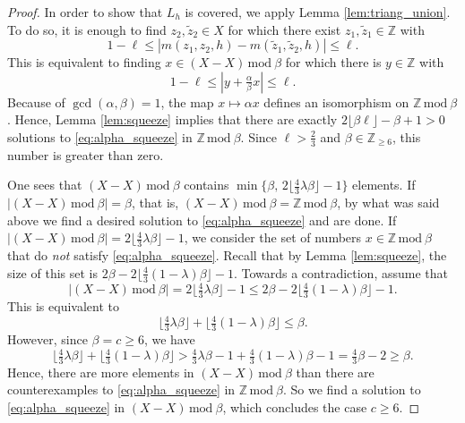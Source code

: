 \documentclass[11pt, a4paper]{amsart}
\newcommand{\ZZ}{\mathbb{Z}}
\numberwithin{equation}{section}
\theoremstyle{plain}
\begin{document}
\begin{proof}
In order to show that $L_h$ is covered, we apply Lemma \ref{lem:triang_union}. To do so,  it is enough to find $z_2,\widetilde z_2\in X$ for which there exist $z_1,\widetilde z_1\in\ZZ$ with
\[
1-\ell \leq |m(z_1,z_2,h) - m(\widetilde z_1,\widetilde z_2,h)| \leq \ell.
\]
This is equivalent to finding $x\in (X-X)\,\mathrm{mod}~\beta$ for which there is $y\in\ZZ$ with
\begin{equation}
\label{eq:alpha_squeeze}
1-\ell \leq |y + \tfrac \alpha\beta x| \leq \ell.
\end{equation}
Because of $\gcd(\alpha,\beta)=1$, the map $x\mapsto \alpha x$ defines an isomorphism on $\ZZ\,\mathrm{mod}~\beta$. Hence, Lemma \ref{lem:squeeze} implies that there are exactly $2\lfloor \beta \ell\rfloor -\beta + 1 > 0$ solutions to \eqref{eq:alpha_squeeze} in $\ZZ\,\mathrm{mod}~\beta$. Since $\ell > \tfrac 23$ and $\beta \in \ZZ_{\geq 6}$, this number is greater than zero.

One sees that $(X-X)\,\mathrm{mod}~\beta$ contains $\min\{\beta,\,2\lfloor\tfrac 43 \lambda\beta\rfloor - 1\}$ elements. If $|(X-X)\,\mathrm{mod}~\beta|=\beta$, that is, $(X-X)\,\mathrm{mod}~\beta= \ZZ\,\mathrm{mod}~\beta $, by what was said above we find a desired solution to \eqref{eq:alpha_squeeze} and are done. If $|(X-X)\,\mathrm{mod}~\beta|=2\lfloor\tfrac 43 \lambda\beta\rfloor - 1$, we consider the set of numbers $x\in \ZZ\,\mathrm{mod}~\beta$ that do \emph{not} satisfy \eqref{eq:alpha_squeeze}. Recall that by Lemma \ref{lem:squeeze}, the size of this set is $2\beta - 2 \lfloor \tfrac 43 (1-\lambda)\beta\rfloor - 1$. Towards a contradiction, assume that
\[
|(X-X)\,\mathrm{mod}~\beta| = 2\lfloor\tfrac 43 \lambda\beta\rfloor - 1 \leq 2\beta - 2 \lfloor \tfrac 43 (1-\lambda)\beta\rfloor - 1.
\]
This is equivalent to
\[
\lfloor \tfrac 43 \lambda \beta \rfloor + \lfloor \tfrac 43 (1-\lambda)\beta\rfloor \leq \beta.
\]
However, since $\beta = c \geq 6$, we have
\[
\lfloor \tfrac 43 \lambda \beta \rfloor + \lfloor \tfrac 43 (1-\lambda)\beta\rfloor > \tfrac 43 \lambda \beta - 1 + \tfrac 43 (1-\lambda)\beta - 1 = \tfrac 43 \beta -2 \geq \beta.
\]
Hence, there are more elements in $(X-X)\,\mathrm{mod}~\beta$ than there are counterexamples to \eqref{eq:alpha_squeeze} in $\ZZ\,\mathrm{mod}~\beta$. So we find a solution to \eqref{eq:alpha_squeeze} in $(X-X)\,\mathrm{mod}~\beta$, which concludes the case $c\geq 6$.


\end{proof}
\end{document}
